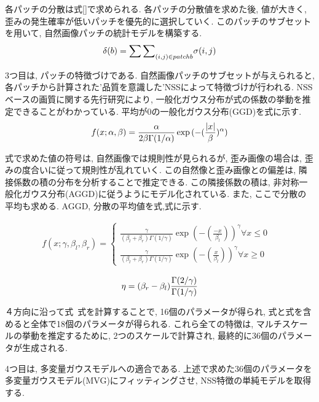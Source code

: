 \documentclass[a4paper,12pt]{jsreport}
\begin{document}
各パッチの分散は式[]で求められる. 各パッチの分散値を求めた後, 値が大きく, 歪みの発生確率が低いパッチを優先的に選択していく. このパッチのサブセットを用いて, 自然画像パッチの統計モデルを構築する.
\begin{equation}
 \delta(b) = {\sum \sum}_{(i,j)\in patchb } \sigma(i,j)\\ 
\end{equation}

3つ目は, パッチの特徴づけである. 自然画像パッチのサブセットが与えられると, 各パッチから計算された'品質を意識した'NSSによって特徴づけが行われる. NSSベースの画質に関する先行研究により, 一般化ガウス分布が式の係数の挙動を推定できることがわかっている. 平均が0の一般化ガウス分布(GGD)を式に示す.
\begin{equation}
 f(x;\alpha, \beta) = \frac{\alpha}{2\beta\Gamma(1/\alpha)}\exp{(-(\frac{|x|}{\beta})^\alpha)}\\ 
\end{equation}

式で求めた値の符号は, 自然画像では規則性が見られるが, 歪み画像の場合は, 歪みの度合いに従って規則性が乱れていく. この自然像と歪み画像との偏差は, 隣接係数の積の分布を分析することで推定できる. この隣接係数の積は, 非対称一般化ガウス分布(AGGD)に従うようにモデル化されている. また, ここで分散の平均も求める. AGGD, 分散の平均値を式,式に示す.

\begin{eqnarray}
f(x;\gamma,\beta_l,\beta_r)=
	\begin{cases}
			\frac{\gamma}{(\beta_l + \beta_r)\Gamma(1/\gamma)}\exp{(-(\frac{-x}{\beta_l}))^\gamma} \forall x \le 0&\\
			\frac{\gamma}{(\beta_l + \beta_r)\Gamma(1/\gamma)}\exp{(-(\frac{x}{\beta_l}))^\gamma} \forall x \ge 0&
	\end{cases}
\end{eqnarray}

\begin{equation}
 \eta = (\beta_r - \beta_l)\frac{\Gamma(2/\gamma)}{\Gamma(1/\gamma)}\\ 
\end{equation}

４方向に沿って式~式を計算することで, 16個のパラメータが得られ, 式と式を含めると全体で18個のパラメータが得られる. これら全ての特徴は, マルチスケールの挙動を推定するために, 2つのスケールで計算され, 最終的に36個のパラメータが生成される. 


4つ目は, 多変量ガウスモデルへの適合である. 上述で求めた36個のパラメータを多変量ガウスモデル(MVG)にフィッティングさせ, NSS特徴の単純モデルを取得する. 
\end{document}
